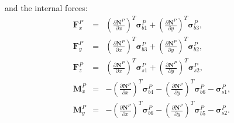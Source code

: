 and the internal forces:
\begin{eqnarray}
	\label{eq:force_2d}
	\textbf{F}^P_{x} &=& 
	\left( \frac{\partial \textbf{N}^P}{\partial x}\right)^T \boldsymbol{\sigma}^P_{b1} +
	\left( \frac{\partial \textbf{N}^P}{\partial y}\right)^T \boldsymbol{\sigma}^P_{b3},\\
	\textbf{F}^P_{y} &=& 
	\left( \frac{\partial \textbf{N}^P}{\partial x}\right)^T \boldsymbol{\sigma}^P_{b3} +
	\left( \frac{\partial \textbf{N}^P}{\partial y}\right)^T \boldsymbol{\sigma}^P_{b2},\\
	\textbf{F}^P_{z} &=& 
	\left( \frac{\partial \textbf{N}^P}{\partial x}\right)^T \boldsymbol{\sigma}^P_{s1} +
	\left( \frac{\partial \textbf{N}^P}{\partial y}\right)^T \boldsymbol{\sigma}^P_{s2},\\
	\textbf{M}^P_{x} &=& 
	-\left( \frac{\partial \textbf{N}^P}{\partial x}\right)^T \boldsymbol{\sigma}^P_{b4} -
	\left( \frac{\partial \textbf{N}^P}{\partial y}\right)^T \boldsymbol{\sigma}^P_{b6} - \boldsymbol{\sigma}^P_{s1},\\
	\textbf{M}^P_{y} &=& 
	-\left( \frac{\partial \textbf{N}^P}{\partial x}\right)^T \boldsymbol{\sigma}^P_{b6} -
	\left( \frac{\partial \textbf{N}^P}{\partial y}\right)^T \boldsymbol{\sigma}^P_{b5} - \boldsymbol{\sigma}^P_{s2}.
\end{eqnarray}